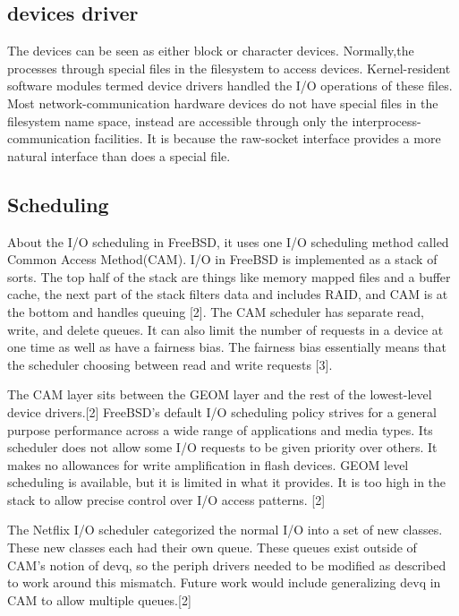 \documentclass[onecolumn, draftclsnofoot,10pt, compsoc]{IEEEtran}
\begin{document}
\subsection{devices driver}

The devices can be seen as either block or character devices. Normally,the processes through special files in the filesystem to access devices. Kernel-resident software modules termed device drivers handled the I/O operations of these files. Most network-communication hardware devices do not have special files in the filesystem name space, instead are accessible through only the interprocess-communication facilities. It is because the raw-socket interface provides a more natural interface than does a special file.

\subsection{Scheduling}

About the I/O scheduling in FreeBSD, it uses one I/O scheduling method called Common Access Method(CAM). I/O in FreeBSD is implemented as a stack of sorts. The top half of the stack are things like memory mapped files and a buffer cache, the next part of the stack filters data and includes RAID, and CAM is at the bottom and handles queuing [2]. The CAM scheduler has separate read, write, and delete queues. It can also limit the number of requests in a device at one time as well as have a fairness bias. The fairness bias essentially means that the scheduler choosing between read and write requests [3].

The CAM layer sits between the GEOM layer and the rest of the lowest-level device drivers.[2] FreeBSD’s default I/O scheduling policy strives for a general purpose performance across a wide range of applications and media types. Its scheduler does not allow some I/O requests to be given priority over others. It makes no allowances for write amplification in flash devices. GEOM level scheduling is available, but it is limited in what it provides. It is too high in the stack to allow precise control over I/O access patterns. [2]

The Netflix I/O scheduler categorized the normal I/O into a set of new classes. These new classes each had their own queue. These queues exist outside of CAM’s notion of devq, so the periph drivers needed to be modified as described to work around this mismatch. Future work would include generalizing devq in CAM to allow multiple queues.[2]
\end{document}
